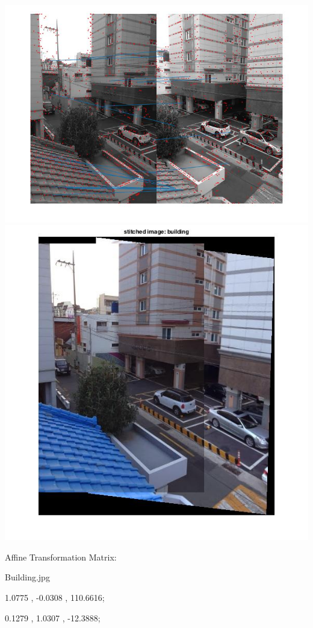 \documentclass[fleqn]{article}
\begin{document}
\begin{center}
\includegraphics[width=1.2\textwidth]{building2.jpg}
\newline
\includegraphics[width=1\textwidth]{building3.jpg}

Affine Transformation Matrix:
\vspace{10 mm}

Building.jpg

1.0775   ,   -0.0308    ,    110.6616;

0.1279   ,   1.0307     ,   -12.3888;

\end{center}
\end{document}
